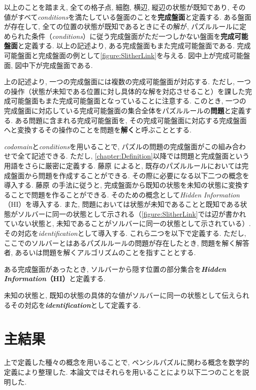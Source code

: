 以上のことを踏まえ, 全ての格子点, 細胞, 横辺, 縦辺の状態が既知であり, その値がすべて\textit{conditions}を満たしている盤面のことを\textbf{完成盤面}と定義する. ある盤面が存在して, 全ての位置の状態が既知であるときにその解が, パズルルールに定められた条件（\textit{conditions}）に従う完成盤面がただ一つしかない盤面を\textbf{完成可能盤面}と定義する. 以上の記述より, ある完成盤面もまた完成可能盤面である. 完成可能盤面と完成盤面の例として\cref{figure:SlitherLink}を与える. 図中上が完成可能盤面, 図中下が完成盤面である.

上の記述より, 一つの完成盤面には複数の完成可能盤面が対応する. ただし, 一つの操作（状態が未知である位置に対し具体的な解を対応させること）を課した完成可能盤面もまた完成可能盤面となっていることに注意する. このとき, 一つの完成盤面に対応している完成可能盤面の集合全体をパズルルールの\textbf{問題}と定義する. ある問題に含まれる完成可能盤面を, その完成可能盤面に対応する完成盤面へと変換するその操作のことを問題を\textbf{解く}と呼ぶこととする.

\textit{codomain}と\textit{conditions}を用いることで, パズルの問題の完成盤面がこの組み合わせで全て記述できる. ただし, \cref{chapter:Definition}以降では問題と完成盤面という用語をさらに厳密に定義する. 藤原 \cite{Fujiwara2022}によると, 既存のパズルルールにおいては完成盤面から問題を作成することができる. その際に必要になる以下二つの概念を導入する. 藤原 \cite{Fujiwara2022}の手法に従うと, 完成盤面から既知の状態を未知の状態に変換することで問題を作ることができる. そのための概念として\textit{Hidden Information}（HI）を導入する. また, 問題においては状態が未知であることと既知である状態がソルバーに同一の状態として示される（\cref{figure:SlitherLink}では辺が書かれていない状態と, 未知であることがソルバーに同一の状態として示されている）. その対応を\textit{identification}として導入する. これら二つを以下で定義する. ただし, ここでのソルバーとはあるパズルルールの問題が存在したとき, 問題を解く解答者, あるいは問題を解くアルゴリズムのことを指すこととする.
\begin{definition}
  ある完成盤面があったとき, ソルバーから隠す位置の部分集合を\textbf{\textit{Hidden Information}（HI）}と定義する.
\end{definition}
\begin{definition}
  未知の状態と, 既知の状態の具体的な値がソルバーに同一の状態として伝えられるその対応を\textbf{\textit{identification}}として定義する.
\end{definition}

\section{主結果}
上で定義した種々の概念を用いることで, ペンシルパズルに関わる概念を数学的定義により整理した. 本論文ではそれらを用いることにより以下二つのことを説明した.
